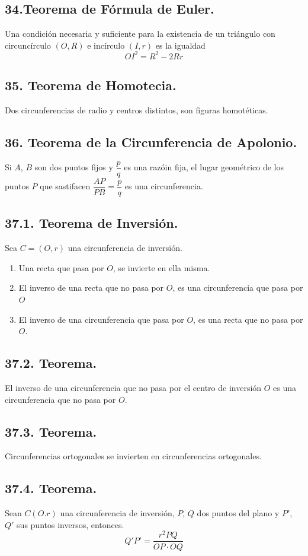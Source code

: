 \documentclass[12pt,a4paper]{article}
\begin{document}
\subsection*{34.Teorema de Fórmula de Euler.}
Una condición necesaria y suficiente para la existencia de un triángulo con circuncírculo $( O, R)$ e incírculo $(I, r)$ es la igualdad $$OI ^2= R^2 - 2Rr$$
\subsection*{35. Teorema de Homotecia.}
Dos circunferencias de radio  y centros distintos, son figuras homotéticas.
\subsection*{36. Teorema de la Circunferencia de Apolonio.}
Si $A$, $B$ son dos puntos fijos y $\dfrac{p}{q}$ es una razóin fija, el lugar geométrico de los puntos $P$ que sastifacen $\dfrac{AP}{PB}=\dfrac{p}{q}$ es una circunferencia.
\subsection*{37.1. Teorema de Inversión.}
Sea $C=(O, r)$ una circunferencia de inversión. 
\begin{enumerate}
\item Una recta que pasa por $O$, se invierte en ella misma.
\item El inverso de una recta que no pasa por $O$, es una circunferencia que pasa por $O$
\item El inverso de una circunferencia que pasa por $O$, es una recta que no pasa por $O$.
\end{enumerate}
\subsection*{37.2. Teorema.}
El inverso de una circunferencia que no pasa por el centro de inversión $O$ es una circunferencia que no pasa por $O$.
\subsection*{37.3. Teorema.}
Circunferencias ortogonales se invierten en circunferencias ortogonales.
\subsection*{37.4. Teorema.}
Sean $C(O. r)$ una circunferencia de inversión, $P$, $Q$ dos puntos del plano y $P'$, $Q'$ sus puntos inversos, entonces.$$Q'P'= \dfrac{r^2PQ}{OP \cdot OQ}$$
\end{document}
